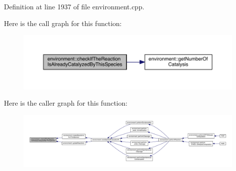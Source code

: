 Definition at line 1937 of file environment.\+cpp.



Here is the call graph for this function\+:\nopagebreak
\begin{figure}[H]
\begin{center}
\leavevmode
\includegraphics[width=350pt]{a00013_ac4c90b07b8e75ea03e2ced0ea644a69f_cgraph}
\end{center}
\end{figure}




Here is the caller graph for this function\+:\nopagebreak
\begin{figure}[H]
\begin{center}
\leavevmode
\includegraphics[width=350pt]{a00013_ac4c90b07b8e75ea03e2ced0ea644a69f_icgraph}
\end{center}
\end{figure}


